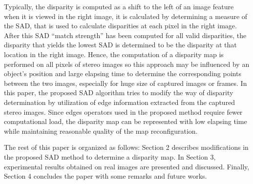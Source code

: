 Typically, the disparity is computed as a shift to the left of
an image feature when it is viewed in the right image, it is
calculated by determining a measure of the SAD, that is used
to calculate disparities at each pixel in the right image.
After this SAD “match strength” has been computed for all
valid disparities, the disparity that yields the lowest SAD is
determined to be the disparity at that location in the right
image. Hence, the computation of a disparity map is
performed on all pixels of stereo images so this approach may
be influenced by an object's position and large elapsing time to
determine the corresponding points between the two images,
especially for huge size of captured images or frames.
In this paper, the proposed SAD algorithm tries to modify
the way of disparity determination by utilization of edge
information extracted from the captured stereo images. Since
edges operators used in the proposed method require fewer
computational load, the disparity map can be represented with
low elapsing time while maintaining reasonable quality of the
map reconfiguration.

The rest of this paper is organized as follows: Section 2
describes modifications in the proposed SAD method to
determine a disparity map. In Section 3, experimental results
obtained on real images are presented and discussed. Finally,
Section 4 concludes the paper with some remarks and future
works. 
